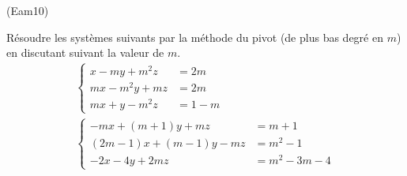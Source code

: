 \begin{tiny}(Eam10)\end{tiny}
R{\'e}soudre les syst{\`e}mes suivants par la méthode du pivot (de plus bas degré en $m$) en discutant suivant la valeur
de $m$.
\begin{eqnarray*}
\left\{
\begin{aligned}
x-my+m^{2}z &=  2m \\
mx-m^{2}y+mz &=  2m \\
mx+y-m^{2}z &=  1-m
\end{aligned}
\right.  \\
\left\{
\begin{aligned}
-mx+(m+1)y+mz &=  m+1 \\
(2m-1)x+(m-1)y-mz &=  m^{2}-1 \\
-2x-4y+2mz &= m^{2}-3m-4
\end{aligned}
\right.
\end{eqnarray*}
